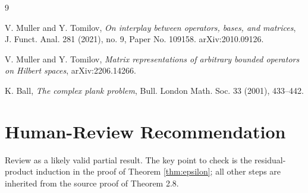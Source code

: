 \documentclass[11pt]{amsart}
\begin{document}
\begin{thebibliography}{9}

V. Muller and Y. Tomilov,
\emph{On interplay between operators, bases, and matrices},
J. Funct. Anal. 281 (2021), no. 9, Paper No. 109158.
arXiv:2010.09126.

V. Muller and Y. Tomilov,
\emph{Matrix representations of arbitrary bounded operators on Hilbert spaces},
arXiv:2206.14266.

K. Ball,
\emph{The complex plank problem},
Bull. London Math. Soc. 33 (2001), 433--442.

\end{thebibliography}

\section*{Human-Review Recommendation}

Review as a likely valid partial result.  The key point to check is the
residual-product induction in the proof of Theorem \ref{thm:epsilon}; all other
steps are inherited from the source proof of Theorem 2.8.
\end{document}
